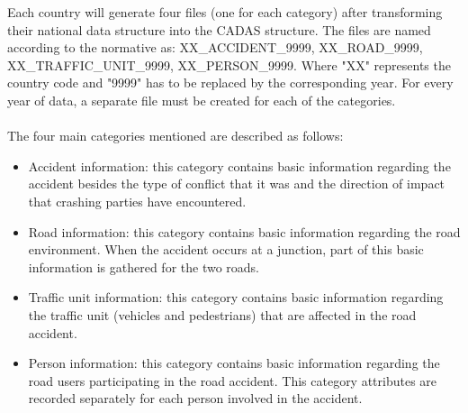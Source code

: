 Each country will generate four files (one for each category) after transforming their national data structure into the \ac{CADAS} structure. The files are named according to the normative as: XX\_ACCIDENT\_9999, XX\_ROAD\_9999, XX\_TRAFFIC\_UNIT\_9999, XX\_PERSON\_9999. Where "XX" represents the country code and "9999" has to be replaced by the corresponding year. For every year of data, a separate file must be created for each of the categories. 
\\
\\
The four main categories mentioned are described as follows: %
\begin{itemize}
    \item Accident information: this category contains basic information regarding the accident besides the type of conflict that it was and the direction of impact that crashing parties have encountered. 
    \item Road information: this category contains basic information regarding the road environment. When the accident occurs at a junction, part of this basic information is gathered for the two roads.
    \item Traffic unit information: this category contains basic information regarding the traffic unit (vehicles and pedestrians) that are affected in the road accident. 
    \item Person information: this category contains basic information regarding the road users participating in the road accident. This category attributes are recorded separately for each person involved in the accident.
\end{itemize}


